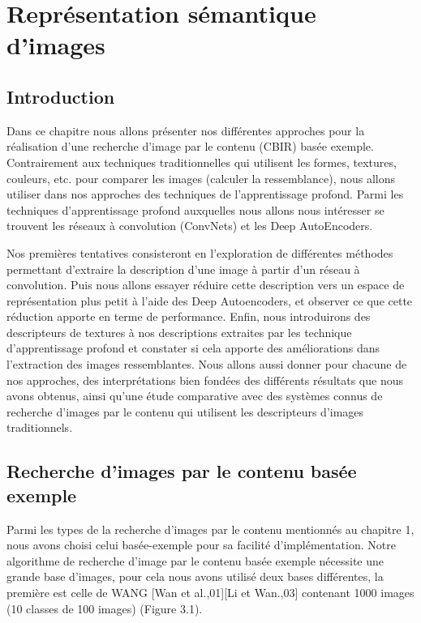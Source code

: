 
\chapter{Représentation sémantique d'images} %

\section{Introduction}
	Dans ce chapitre nous allons présenter nos différentes approches pour la réalisation d'une recherche d'image par le contenu (CBIR) basée exemple. Contrairement aux techniques traditionnelles qui utilisent les formes, textures, couleurs, etc. pour comparer les images (calculer la ressemblance), nous allons utiliser dans nos approches des techniques de l'apprentissage profond. Parmi les techniques d'apprentissage profond auxquelles nous allons nous intéresser se trouvent les réseaux à convolution (ConvNets) et les Deep AutoEncoders. 
	
	Nos premières tentatives consisteront en l'exploration de différentes méthodes permettant d'extraire la description d'une image à partir d'un réseau à convolution. Puis nous allons essayer réduire cette description vers un espace de représentation plus petit à l'aide des Deep Autoencoders, et observer ce que cette réduction apporte en terme de performance. Enfin, nous introduirons des descripteurs de textures à nos descriptions extraites par les technique d'apprentissage profond et constater si cela apporte des améliorations dans l'extraction des images ressemblantes. Nous allons aussi donner pour chacune de nos approches, des interprétations bien fondées des différents résultats que nous avons obtenus, ainsi qu'une étude comparative avec des systèmes connus de recherche d'images par le contenu qui utilisent les descripteurs d'images traditionnels.
	
	


\section{Recherche d'images par le contenu basée exemple}
	Parmi les types de la recherche d'images par le contenu mentionnés au chapitre 1, nous avons choisi celui basée-exemple pour sa facilité d'implémentation. Notre algorithme de recherche d'image par le contenu basée exemple nécessite une grande base d'images, pour cela nous avons utilisé deux bases différentes, la première est celle de WANG [Wan et al.,01][Li et Wan.,03] contenant 1000 images (10 classes de 100 images) (Figure 3.1).

